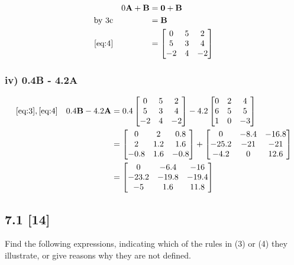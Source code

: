 \documentclass{article}
\begin{document}
\begin{align}
    \label{eq:10} 
    && 0\textbf{A} + \textbf{B} &= \textbf{0} + \textbf{B}
    \\
    \label{eq:11}
    \text{by 3c} && &= \textbf{B}
    \\
    \label{eq:12}
    \eqref{eq:4} && &= \begin{bmatrix} 0 & 5 & 2\\ 5 & 3 & 4\\ -2 & 4 & -2 \end{bmatrix}
\end{align}

\subsubsection*{iv) 0.4\textbf{B} - 4.2\textbf{A}}

\begin{align}
    \label{eq:13}
    \eqref{eq:3}, \eqref{eq:4} && 0.4\textbf{B} - 4.2\textbf{A} &= 0.4\begin{bmatrix} 0 & 5 & 2\\ 5 & 3 & 4\\ -2 & 4 & -2 \end{bmatrix} -4.2\begin{bmatrix} 0 & 2 & 4\\ 6 & 5 & 5\\ 1 & 0 & -3 \end{bmatrix}
    \\
    \label{eq:14}
    && &= 
    \begin{bmatrix}
    0 & 2 & 0.8\\
    2 & 1.2 & 1.6\\
    -0.8 & 1.6 & -0.8
    \end{bmatrix}
    +
    \begin{bmatrix}
    0 & -8.4 & -16.8\\
    -25.2 & -21 & -21\\
    -4.2 & 0 & 12.6
    \end{bmatrix}
    \\
    \label{eq:15}
    && &=
    \begin{bmatrix}
    0 & -6.4 & -16\\
    -23.2 & -19.8 & -19.4\\
    -5 & 1.6 & 11.8
    \end{bmatrix}
\end{align}

\subsection*{7.1 [14]}

\par Find the following expressions, indicating which of the rules in (3) or (4) they illustrate, or give reasons why they are not defined.

\def \umatrix {
\begin{bmatrix}
1.5\\
0\\
-3.0
\end{bmatrix}
}
\def \vmatrix {
\begin{bmatrix}
-1\\
3\\
2
\end{bmatrix}
}
\def \wmatrix {
\begin{bmatrix}
-5\\
-30\\
10
\end{bmatrix}
}
\def \Ematrix {
\begin{bmatrix}
0 & 2\\
3 & 4\\
3 & -1
\end{bmatrix}
}
\end{document}
